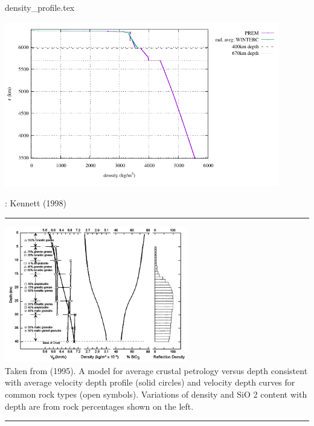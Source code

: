 \begin{flushright} {\tiny {\color{gray} density\_profile.tex}} \end{flushright}

\begin{center}
\includegraphics[width=12cm]{images/density_profile/density_profile}
\end{center}

\Literature: Kennett (1998) \cite{kenn98}

\textcolor[RGB]{220,220,220}{\rule{\linewidth}{0.2pt}}

\begin{center}
\includegraphics[width=8cm]{images/density_profile/chmo95}\\
{\captionfont Taken from \textcite{chmo95} (1995).
A model for average crustal petrology versus depth consistent with average velocity depth
profile (solid circles) and velocity depth curves for common rock types (open symbols). 
Variations of density and SiO 2 content with depth are from rock percentages
shown on the left.} 
\end{center}


\textcolor[RGB]{220,220,220}{\rule{\linewidth}{0.2pt}}

